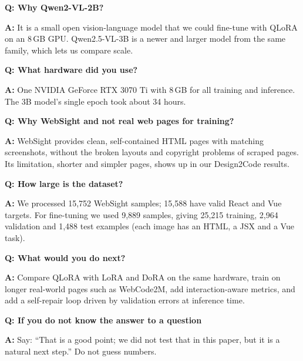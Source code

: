 \documentclass[11pt,a4paper]{article}
\newcommand{\q}[1]{\par\medskip\noindent\textbf{\color{navy}Q: #1}\par}
\newcommand{\ans}{\noindent\textbf{A:} }
\begin{document}
\q{Why Qwen2-VL-2B?}
\ans It is a small open vision-language model that we could fine-tune with QLoRA on an 8\,GB GPU. Qwen2.5-VL-3B is a
newer and larger model from the same family, which lets us compare scale.

\q{What hardware did you use?}
\ans One NVIDIA GeForce RTX 3070 Ti with 8\,GB for all training and inference. The 3B model's single epoch took about 34
hours.

\q{Why WebSight and not real web pages for training?}
\ans WebSight provides clean, self-contained HTML pages with matching screenshots, without the broken layouts and
copyright problems of scraped pages. Its limitation, shorter and simpler pages, shows up in our Design2Code results.

\q{How large is the dataset?}
\ans We processed 15,752 WebSight samples; 15,588 have valid React and Vue targets. For fine-tuning we used 9,889 samples,
giving 25,215 training, 2,964 validation and 1,488 test examples (each image has an HTML, a JSX and a Vue task).

\q{What would you do next?}
\ans Compare QLoRA with LoRA and DoRA on the same hardware, train on longer real-world pages such as WebCode2M, add
interaction-aware metrics, and add a self-repair loop driven by validation errors at inference time.

\q{If you do not know the answer to a question}
\ans Say: ``That is a good point; we did not test that in this paper, but it is a natural next step.'' Do not guess
numbers.
\end{document}
